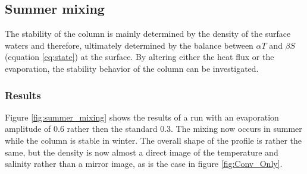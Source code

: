 \documentclass[twocolumn]{article}
\begin{document}
\subsection{Summer mixing}
The stability of the column is mainly determined by the density of the surface waters and therefore, ultimately determined by the balance between $\alpha T$ and $\beta S$ (equation \ref{eq:state}) at the surface. By altering either the heat flux or the evaporation, the stability behavior of the column can be investigated.

\subsubsection{Results}
Figure \ref{fig:summer_mixing} shows the results of a run with an evaporation amplitude of 0.6 rather then the standard 0.3. The mixing now occurs in summer while the column is stable in winter. The overall shape of the profile is rather the same, but the density is now almost a direct image of the temperature and salinity rather than a mirror image, as is the case in figure \ref{fig:Conv_Only}. 
\end{document}
